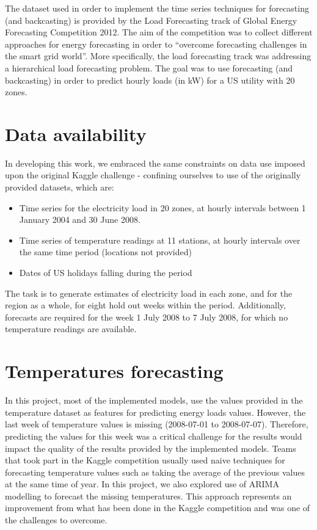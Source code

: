 \documentclass{article} %
\begin{document}
The dataset used in order to implement the time series techniques for forecasting (and backcasting) is provided by the Load Forecasting track of Global Energy Forecasting Competition 2012. The aim of the competition was to collect different approaches for energy forecasting in order to “overcome forecasting challenges in the smart grid world”. More specifically, the load forecasting track was addressing a hierarchical load forecasting problem. The goal was to use forecasting (and backcasting) in order to predict hourly loads (in kW) for a US utility with 20 zones.



\section*{Data availability}
In developing this work, we embraced the same constraints on data use imposed upon the original Kaggle challenge - confining ourselves to use of the originally provided datasets, which are:
\begin{itemize}
\item Time series for the electricity load in 20 zones, at hourly intervals between 1 January 2004 and 30 June 2008.
\item Time series of temperature readings at 11 stations, at hourly intervals over the same time period (locations not provided)
\item Dates of US holidays falling during the period
\end{itemize}
The task is to generate estimates of electricity load in each zone, and for the region as a whole, for eight hold out weeks within the period.  Additionally, forecasts are required for the week 1 July 2008 to 7 July 2008, for which no temperature readings are available.

\section*{Temperatures forecasting}
In this project, most of the implemented models, use the values provided in the temperature dataset as features for predicting energy loads values. However, the last week of temperature values is missing (2008-07-01 to 2008-07-07). Therefore, predicting the values for this week was a critical challenge for the results would impact the quality of the results provided by the implemented models.
Teams that took part in the Kaggle competition usually used naive techniques for forecasting temperature values such as taking the average of the previous values at the same time of year. In this project, we also explored use of ARIMA modelling to forecast the missing temperatures. This approach represents an improvement from what has been done in the Kaggle competition and was one of the challenges to overcome.
\end{document}
